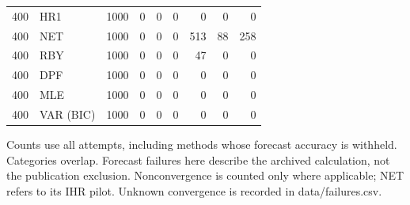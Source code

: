 \begin{table}[p]
{\begin{tabular}{llrrrrrrr}
400 & HR1 & 1000 & 0 & 0 & 0 & 0 & 0 & 0 \\
400 & NET & 1000 & 0 & 0 & 0 & 513 & 88 & 258 \\
400 & RBY & 1000 & 0 & 0 & 0 & 47 & 0 & 0 \\
400 & DPF & 1000 & 0 & 0 & 0 & 0 & 0 & 0 \\
400 & MLE & 1000 & 0 & 0 & 0 & 0 & 0 & 0 \\
400 & VAR (BIC) & 1000 & 0 & 0 & 0 & 0 & 0 & 0 \\
\bottomrule\end{tabular}}
\par\medskip
\begin{minipage}{\linewidth}\footnotesize Counts use all attempts, including methods whose forecast accuracy is withheld. Categories overlap. Forecast failures here describe the archived calculation, not the publication exclusion. Nonconvergence is counted only where applicable; NET refers to its IHR pilot. Unknown convergence is recorded in data/failures.csv. \end{minipage}
\end{table}

